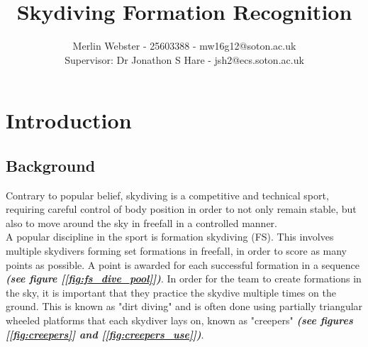 \documentclass[a4paper, 11pt]{article}
\begin{document}
\setlength{\droptitle}{-7em}
\title{\textbf{Skydiving Formation Recognition}}
\author{Merlin Webster - 25603388 - mw16g12@soton.ac.uk \\Supervisor: Dr Jonathon S Hare - jsh2@ecs.soton.ac.uk}
\date{}
\maketitle{}
%
\noindent
%
\section{Introduction}
	\subsection{Background}
Contrary to popular belief, skydiving is a competitive and technical sport, requiring careful control of body position in order to not only remain stable, but also to move around the sky in freefall in a controlled manner.\\
A popular discipline in the sport is formation skydiving (FS). This involves multiple skydivers forming set formations in freefall, in order to score as many points as possible. A point is awarded for each successful formation in a sequence \textbf{\emph{(see figure [\ref{fig:fs_dive_pool}])}}.
%
In order for the team to create formations in the sky, it is important that they practice the skydive multiple times on the ground. This is known as "dirt diving" and is often done using partially triangular wheeled platforms that each skydiver lays on, known as "creepers"  \textbf{\emph{(see figures [\ref{fig:creepers}] and [\ref{fig:creepers_use}])}}.
\end{document}
